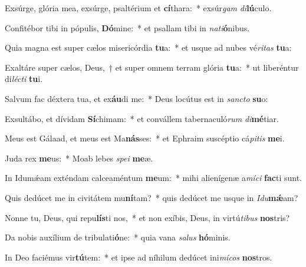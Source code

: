\item Exsúrge, glória mea, exsúrge, psaltérium et \textbf{cí}thara:~* exsúr\textit{gam} \textit{di}\textbf{lú}culo.
\item Confitébor tibi in pópulis, \textbf{Dó}mine:~* et psallam tibi in \textit{na}\textit{ti}\textbf{ó}nibus.
\item Quia magna est super cælos misericórdia \textbf{tu}a:~* et usque ad nubes vé\textit{ri}\textit{tas} \textbf{tu}a:
\item Exaltáre super cælos, Deus,~† et super omnem terram glória \textbf{tu}a:~* ut liberéntur di\textit{léc}\textit{ti} \textbf{tu}i.
\item Salvum fac déxtera tua, et ex\textbf{áu}di me:~* Deus locútus est in \textit{sanc}\textit{to} \textbf{su}o:
\item Exsultábo, et dívidam \textbf{Sí}chimam:~* et convállem tabernaculó\textit{rum} \textit{di}\textbf{mé}tiar.
\item Meus est Gálaad, et meus est Ma\textbf{nás}ses:~* et Ephraim suscéptio cá\textit{pi}\textit{tis} \textbf{me}i.
\item Juda rex \textbf{me}us:~* Moab lebes \textit{spe}\textit{i} \textbf{me}æ.
\item In Idumǽam exténdam calceaméntum \textbf{me}um:~* mihi alienígenæ a\textit{mí}\textit{ci} \textbf{fac}ti sunt.
\item Quis dedúcet me in civitátem mu\textbf{ní}tam?~* quis dedúcet me usque in \textit{I}\textit{du}\textbf{mǽ}am?
\item Nonne tu, Deus, qui repu\textbf{lís}ti nos,~* et non exíbis, Deus, in virtú\textit{ti}\textit{bus} \textbf{nos}tris?
\item Da nobis auxílium de tribulati\textbf{ó}ne:~* quia vana \textit{sa}\textit{lus} \textbf{hó}minis.
\item In Deo faciémus vir\textbf{tú}tem:~* et ipse ad níhilum dedúcet ini\textit{mí}\textit{cos} \textbf{nos}tros.
